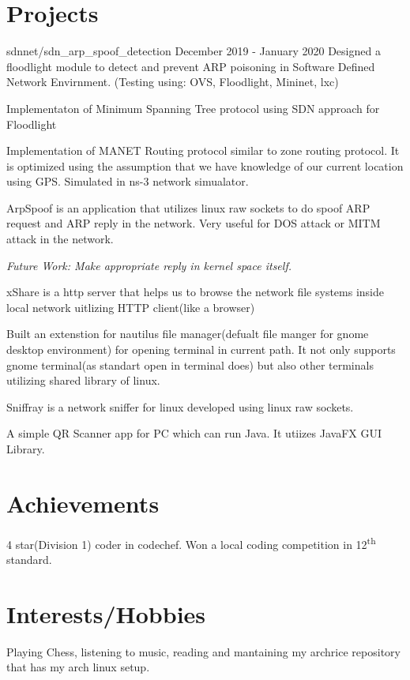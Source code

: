 \documentclass{article}
\begin{document}
\section{Projects}

{sdnnet/sdn\_arp\_spoof\_detection}
{December 2019 - January 2020}
Designed a floodlight module to detect and prevent ARP poisoning in Software Defined Network Envirnment. (Testing using: OVS, Floodlight, Mininet, lxc)

Implementaton of Minimum Spanning Tree protocol using SDN approach for Floodlight

Implementation of MANET Routing protocol similar to zone routing protocol. It is optimized using the assumption that we have knowledge of our current location using GPS. Simulated in ns-3 network simualator.

ArpSpoof is an application that utilizes linux raw sockets to do spoof ARP request and ARP reply in the network. Very useful for DOS attack or MITM attack in the network.

\textit{Future Work: Make appropriate reply in kernel space itself.}

xShare is a http server  that helps us to browse the network file systems inside local network uitlizing HTTP client(like a browser)

Built an extenstion for nautilus file manager(defualt file manger for gnome desktop environment) for opening terminal in current path. It not only supports gnome terminal(as standart open in terminal does) but also other terminals utilizing shared library of linux.

Sniffray is a network sniffer for linux developed using linux raw sockets.

A simple QR Scanner app for PC which can run Java. It utiizes JavaFX GUI Library.


\section{Achievements}
4 star(Division 1) coder in codechef. Won a local coding competition in 12\textsuperscript{th} standard.

\section{Interests/Hobbies}

Playing Chess, listening to music, reading and mantaining my archrice repository that has my arch linux setup.
\printbibliography
\end{document}
